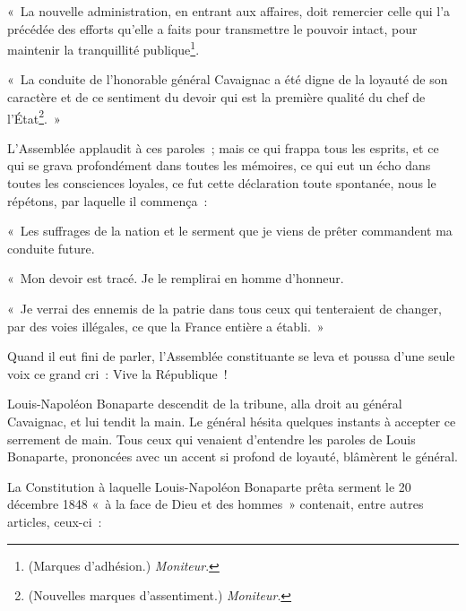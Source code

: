 \documentclass[french,twoside]{book} %
\newenvironment{quoteblock}%
  {\begin{quoting}}
  {\end{quoting}}
\newenvironment{quotebar}{%
    \def\FrameCommand{{\color{rubric!10!}\vrule width 0.5em} \hspace{0.9em}}%
    \def\OuterFrameSep{0pt} %
    \MakeFramed {\advance\hsize-\width \FrameRestore}
  }%
  {%
    \endMakeFramed
  }
\renewenvironment{quoteblock}%
  {%
    \savenotes
    \setstretch{0.9}
    \begin{quotebar}
    \smallskip
  }
  {%
    \smallskip
    \end{quotebar}
    \spewnotes
  }
\begin{document}
\begin{quoteblock}
 \noindent « La nouvelle administration, en entrant aux affaires, doit remercier celle qui l’a précédée des efforts qu’elle a faits pour transmettre le pouvoir intact, pour maintenir la tranquillité publique\footnote{(Marques d’adhésion.) \emph{Moniteur}.}.\par
 « La conduite de l’honorable général Cavaignac a été digne de la loyauté de son caractère et de ce sentiment du devoir qui est la première qualité du chef de l’État\footnote{(Nouvelles marques d’assentiment.) \emph{Moniteur}.}. »
 \end{quoteblock}

\noindent L’Assemblée applaudit à ces paroles ; mais ce qui frappa tous les esprits, et ce qui se grava profondément dans toutes les mémoires, ce qui eut un écho dans toutes les consciences loyales, ce fut cette déclaration toute spontanée, nous le répétons, par laquelle il commença :\par

\begin{quoteblock}
 \noindent « Les suffrages de la nation et le serment que je viens de prêter commandent ma conduite future.\par
 « Mon devoir est tracé. Je le remplirai en homme d’honneur.\par
 « Je verrai des ennemis de la patrie dans tous ceux qui tenteraient de changer, par des voies illégales, ce que la France entière a établi. »
 \end{quoteblock}

\noindent Quand il eut fini de parler, l’Assemblée constituante se leva et poussa d’une seule voix ce grand cri : Vive la République !\par
Louis-Napoléon Bonaparte descendit de la tribune, alla droit au général Cavaignac, et lui tendit la main. Le général hésita quelques instants à accepter ce serrement de main. Tous ceux qui venaient d’entendre les paroles de Louis Bonaparte, prononcées avec un accent si profond de loyauté, blâmèrent le général.\par
La Constitution à laquelle Louis-Napoléon Bonaparte prêta serment le 20 décembre 1848 « à la face de Dieu et des hommes » contenait, entre autres articles, ceux-ci :\par
\end{document}
